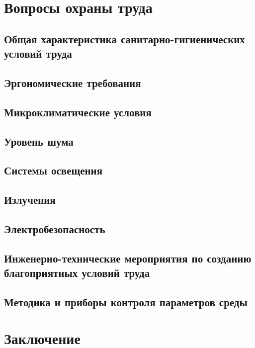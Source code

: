 \documentclass[12pt,a4paper]{report}
\begin{document}
\chapter{Вопросы охраны труда}

\section{Общая характеристика санитарно-гигиенических условий труда}
\section{Эргономические требования}
\section{Микроклиматические условия}
\section{Уровень шума}
\section{Системы освещения}
\section{Излучения}
\section{Электробезопасность}
\section{Инженерно-технические мероприятия по созданию благоприятных условий труда}
\section{Методика и приборы контроля параметров среды}


\chapter*{Заключение}
\end{document}
